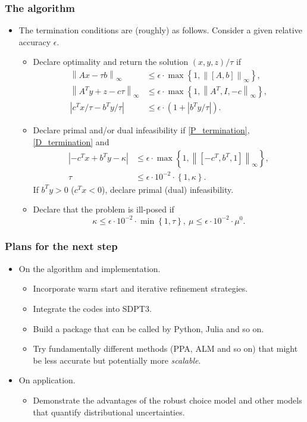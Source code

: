 \documentclass{beamer}
\begin{document}
\begin{frame}
	\frametitle{The algorithm}
	\begin{itemize}
		\item The termination conditions are (roughly) as follows. Consider a given relative accuracy $\epsilon$.
		\begin{itemize}
		\item Declare optimality and return the solution $(x,y,z)/\tau$ if
		\begin{align}
		\left\| Ax-\tau b \right\|_{\infty} &\leq \epsilon \cdot \max \left\{1, \left\|[A,b]\right\|_{\infty}\right\}, \label{P_termination}\\
		\left\|A^T y + z-c\tau\right\|_{\infty} &\leq \epsilon \cdot \max \left\{1, \left\|A^T, I , -c\right\|_{\infty}\right\},\label{D_termination}\\
		\left|c^T x/\tau - b^T y/\tau\right|  &\leq \epsilon\cdot\left(1+\left|b^T y/\tau\right|\right).\label{A_termination}
		\end{align}
		\item Declare primal and/or dual infeasibility if \eqref{P_termination}, \eqref{D_termination} and 
		\begin{align}
		\left|-c^T x+b^T y - \kappa \right| &\leq \epsilon\cdot \max \left\{1, \left\|\left[-c^T, b^T, 1\right]\right\|_{\infty}\right\}, \label{G_termination}\\
		\tau &\leq \epsilon \cdot 10^{-2} \cdot \left\{1,\kappa\right\}.\label{T_terminal}
		\end{align}
		If $b^T y>0$ ($c^T x<0$), declare primal (dual) infeasibility.
		\item Declare that the problem is ill-posed if 
		\[ \kappa \leq \epsilon \cdot 10^{-2}\cdot \min \left\{1,\tau\right\},\
		\mu \leq \epsilon \cdot 10^{-2}\cdot \mu^0.\]
		\end{itemize}
	\end{itemize}
\end{frame}

\begin{frame}
	\frametitle{Plans for the next step}
	\begin{itemize}
		\item On the algorithm and implementation.
		\begin{itemize}
				\item Incorporate warm start and iterative refinement strategies.
				\item Integrate the codes into SDPT3.
				\item Build a package that can be called by Python, Julia and so on.
				\item Try fundamentally different methods (PPA, ALM and so on) that might be less accurate but potentially more \textit{scalable}.
		\end{itemize}
		\item On application.
		\begin{itemize}
			\item Demonstrate the advantages of the robust choice model and other models that quantify distributional uncertainties.
		\end{itemize}
	\end{itemize}
\end{frame}
\end{document}
